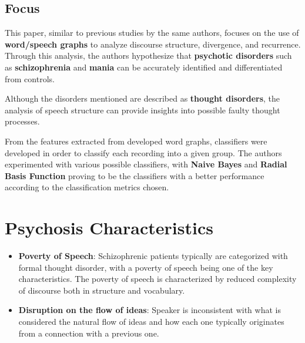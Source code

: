 \documentclass{Paper_Summary}
\begin{document}
\makepapertitle

\breakline

\begin{center}
    \section*{Focus}
\end{center}

    This paper, similar to previous studies by the same authors, focuses on the use of \textbf{word/speech graphs} to analyze discourse structure, divergence, and recurrence. Through this analysis, the authors hypothesize that \textbf{psychotic disorders} such as \textbf{schizophrenia} and \textbf{mania} can be accurately identified and differentiated from controls.
    
    Although the disorders mentioned are described as \textbf{thought disorders}, the analysis of speech structure can provide insights into possible faulty thought processes.

    From the features extracted from developed word graphs, classifiers were developed in order to classify each recording into a given group. The authors experimented with various possible classifiers, with \textbf{Naive Bayes} and \textbf{Radial Basis Function} proving to be the classifiers with a better performance according to the classification metrics chosen.

\breakline

\newpage

\section{Psychosis Characteristics}
    \begin{itemize}
        \item \textbf{Poverty of Speech}: Schizophrenic patients typically are categorized with formal thought disorder, with a poverty of speech being one of the key characteristics. The poverty of speech is characterized by reduced complexity of discourse both in structure and vocabulary.
        \item \textbf{Disruption on the flow of ideas}: Speaker is inconsistent with what is considered the natural flow of ideas and how each one typically originates from a connection with a previous one.
        
    \end{itemize}
\end{document}
